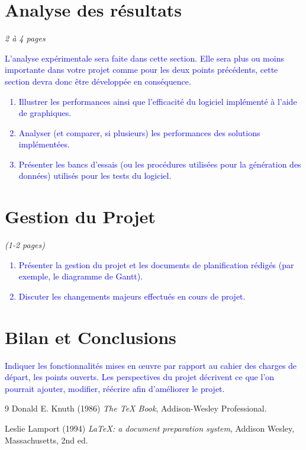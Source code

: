 \documentclass{article}
\begin{document}

\newpage
\section{Analyse des résultats}
    \emph{2 à 4 pages}
    \textcolor{blue}{
    L'analyse expérimentale sera faite dans cette section. Elle sera plus ou moins importante dans votre projet comme pour les deux points précédents, cette section devra donc être développée en conséquence.
    \begin{enumerate}%
        \item Illustrer les performances ainsi que l'efficacité du logiciel implémenté à l'aide de graphiques.
        \item Analyser (et comparer, si plusieurs) les performances des solutions implémentées.
        \item Présenter les bancs d'essais (ou les procédures utilisées pour la génération des données) utilisés pour les tests du logiciel.
    \end{enumerate}
    }


\section{Gestion du Projet}
    \emph{(1-2 pages)}
    \textcolor{blue}{
    \begin{enumerate}%
        \item Présenter la gestion du projet et les documents de planification rédigés (par exemple, le diagramme de Gantt).
        \item Discuter les changements majeurs effectués en cours de projet.
    \end{enumerate}
    }


\section{Bilan et Conclusions}
    \textcolor{blue}{
    Indiquer les fonctionnalités mises en œuvre par rapport au cahier des charges de départ, les points ouverts.
    Les perspectives du projet décrivent ce que l’on pourrait ajouter, modifier, réécrire afin d’améliorer le projet.
    }




\begin{thebibliography}{9}
    Donald E. Knuth (1986) \emph{The \TeX{} Book}, Addison-Wesley Professional.

    Leslie Lamport (1994) \emph{\LaTeX: a document preparation system}, Addison
    Wesley, Massachusetts, 2nd ed.
    \end{thebibliography}
\end{document}
